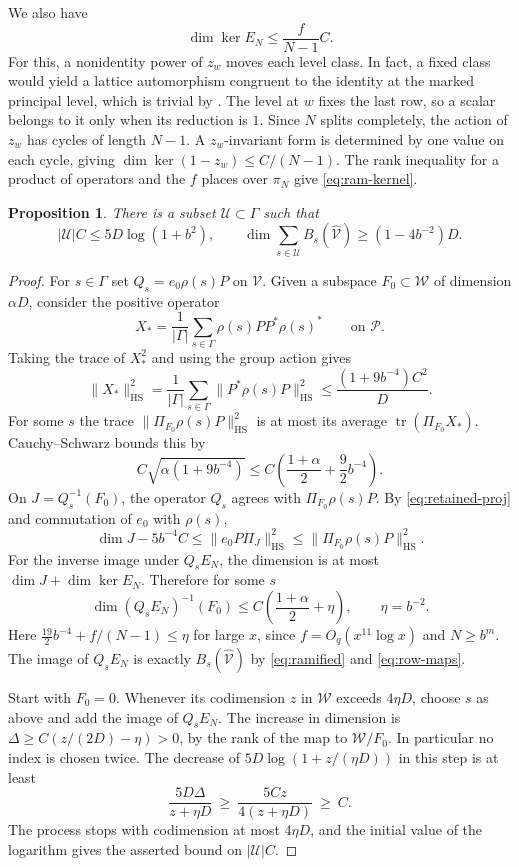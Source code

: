 \documentclass[11pt,reqno]{amsart}
\newtheorem{proposition}[theorem]{Proposition}
\theoremstyle{definition}
\numberwithin{equation}{section}
\newcommand{\tr}{\operatorname{tr}}
\newcommand{\HS}{\mathrm{HS}}
\begin{document}
We also have
\begin{equation}\label{eq:ram-kernel}
 \dim\ker E_N\le \frac{f}{N-1}C.
\end{equation}
For this, a nonidentity power of \(z_w\) moves each level class.
In fact, a fixed class would yield a lattice automorphism
congruent to the identity at the marked principal level, which
is trivial by \cite[Lemma~8.12]{chojecki}. The level at \(w\)
fixes the last row, so a scalar belongs to it only when its
reduction is \(1\). Since \(N\) splits completely, the action
of \(z_w\) has cycles of length \(N-1\). A \(z_w\)-invariant
form is determined by one value on each cycle, giving
\(\dim\ker(1-z_w)\le C/(N-1)\). The rank inequality for a
product of operators and the \(f\) places over \(\pi_N\) give
\eqref{eq:ram-kernel}.

\begin{proposition}\label{prop:span}
There is a subset \(\mathcal U\subset\Gamma\) such that
\[
 |\mathcal U|C\le5D\log(1+b^2),\qquad
 \dim\sum_{s\in\mathcal U}B_s(\widehat{\mathcal V})
       \ge(1-4b^{-2})D.
\]
\end{proposition}

\begin{proof}
For \(s\in\Gamma\) set \(Q_s=e_0\rho(s)P\) on
\(\mathcal V\). Given a subspace \(F_0\subset\mathcal W\)
of dimension \(\alpha D\), consider the positive operator
\[
 X_*=\frac1{|\Gamma|}\sum_{s\in\Gamma}
               \rho(s)PP^*\rho(s)^*
 \qquad \text{on }\mathcal P .
\]
Taking the trace of \(X_*^2\) and using the group action gives
\[
 \|X_*\|_{\HS}^2
   =\frac1{|\Gamma|}\sum_{s\in\Gamma}\|P^*\rho(s)P\|_{\HS}^2
   \le\frac{(1+9b^{-4})C^2}{D}.
\]
For some \(s\) the trace
\(\|\Pi_{F_0}\rho(s)P\|_{\HS}^2\) is at most its average
\(\tr(\Pi_{F_0}X_*)\). Cauchy--Schwarz bounds this by
\[
 C\sqrt{\alpha(1+9b^{-4})}
       \le C\left(\frac{1+\alpha}{2}+\frac92b^{-4}\right).
\]
On \(J=Q_s^{-1}(F_0)\), the operator \(Q_s\) agrees with
\(\Pi_{F_0}\rho(s)P\). By \eqref{eq:retained-proj}
and commutation of \(e_0\) with \(\rho(s)\),
\[
 \dim J-5b^{-4}C
 \le\|e_0P\Pi_J\|_{\HS}^2
 \le\|\Pi_{F_0}\rho(s)P\|_{\HS}^2.
\]
For the inverse image under \(Q_sE_N\), the dimension is
at most \(\dim J+\dim\ker E_N\). Therefore for some \(s\)
\[
 \dim (Q_sE_N)^{-1}(F_0)
       \le C\left(\frac{1+\alpha}{2}+\eta\right),
 \qquad
 \eta=b^{-2}.
\]
Here \(\frac{19}{2}b^{-4}+f/(N-1)\le\eta\) for large \(x\),
since \(f=O_q(x^{11}\log x)\) and \(N\ge b^m\).
The image of \(Q_sE_N\) is exactly \(B_s(\widehat{\mathcal V})\)
by \eqref{eq:ramified} and \eqref{eq:row-maps}.

Start with \(F_0=0\). Whenever its codimension \(z\) in
\(\mathcal W\) exceeds \(4\eta D\), choose \(s\) as above
and add the image of \(Q_sE_N\).
The increase in dimension is
\(\Delta\ge C(z/(2D)-\eta)>0\), by the rank of the map to
\(\mathcal W/F_0\). In particular no index is chosen twice.
The decrease of \(5D\log(1+z/(\eta D))\) in this step is at least
\[
 \frac{5D\Delta}{z+\eta D}\ \ge\
 \frac{5Cz}{4(z+\eta D)}\ \ge\ C.
\]
The process stops with codimension at most \(4\eta D\), and
the initial value of the logarithm gives the asserted bound
on \(|\mathcal U|C\).
\end{proof}
\end{document}
